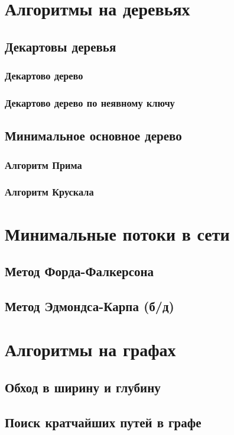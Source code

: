 \documentclass[a4paper]{article}
\begin{document}
\section{Алгоритмы на деревьях}
\subsection{Декартовы деревья}
\subsubsection{Декартово дерево}
\subsubsection{Декартово дерево по неявному ключу}

\subsection{Минимальное основное дерево}
\subsubsection{Алгоритм Прима}
\subsubsection{Алгоритм Крускала}

\section{Минимальные потоки в сети}
\subsection{Метод Форда-Фалкерсона}
\subsection{Метод Эдмондса-Карпа (б/д)}

\section{Алгоритмы на графах}
\subsection{Обход в ширину и глубину}
\subsection{Поиск кратчайших путей в графе}
\end{document}
